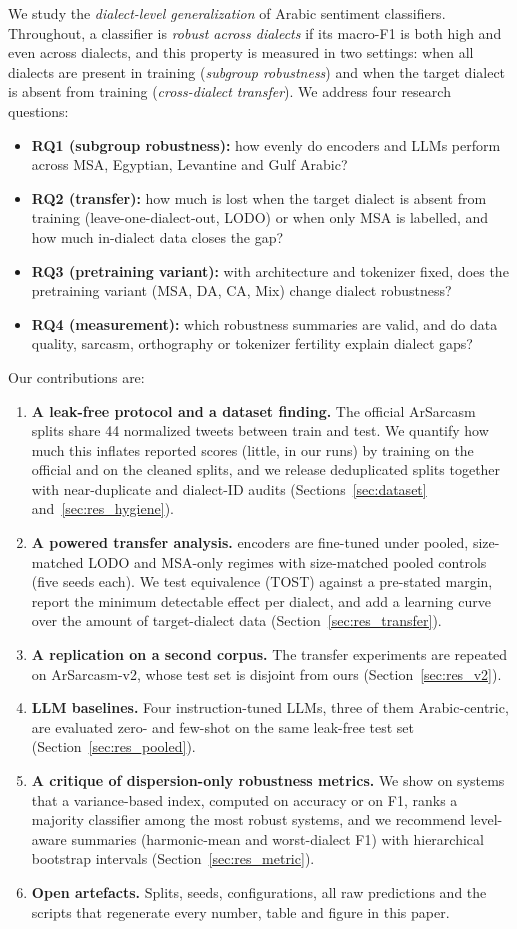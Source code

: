 \documentclass[11pt]{article}
\begin{document}
We study the \emph{dialect-level generalization} of Arabic sentiment classifiers. Throughout, a classifier is \emph{robust across dialects} if its macro-F1 is both high and even across dialects, and this property is measured in two settings: when all dialects are present in training (\emph{subgroup robustness}) and when the target dialect is absent from training (\emph{cross-dialect transfer}). We address four research questions:
\begin{itemize}
\item \textbf{RQ1 (subgroup robustness):} how evenly do encoders and LLMs perform across MSA, Egyptian, Levantine and Gulf Arabic?
\item \textbf{RQ2 (transfer):} how much is lost when the target dialect is absent from training (leave-one-dialect-out, LODO) or when only MSA is labelled, and how much in-dialect data closes the gap?
\item \textbf{RQ3 (pretraining variant):} with architecture and tokenizer fixed, does the pretraining variant (MSA, DA, CA, Mix) change dialect robustness?
\item \textbf{RQ4 (measurement):} which robustness summaries are valid, and do data quality, sarcasm, orthography or tokenizer fertility explain dialect gaps?
\end{itemize}
Our contributions are:
\begin{enumerate}
\item \textbf{A leak-free protocol and a dataset finding.} The official ArSarcasm splits share 44 normalized tweets between train and test. We quantify how much this inflates reported scores (little, in our runs) by training on the official and on the cleaned splits, and we release deduplicated splits together with near-duplicate and dialect-ID audits (Sections~\ref{sec:dataset} and~\ref{sec:res_hygiene}).
\item \textbf{A powered transfer analysis.} \nEnc{} encoders are fine-tuned under pooled, size-matched LODO and MSA-only regimes with size-matched pooled controls (five seeds each). We test equivalence (TOST) against a pre-stated margin, report the minimum detectable effect per dialect, and add a learning curve over the amount of target-dialect data (Section~\ref{sec:res_transfer}).
\item \textbf{A replication on a second corpus.} The transfer experiments are repeated on ArSarcasm-v2, whose test set is disjoint from ours (Section~\ref{sec:res_v2}).
\item \textbf{LLM baselines.} Four instruction-tuned LLMs, three of them Arabic-centric, are evaluated zero- and few-shot on the same leak-free test set (Section~\ref{sec:res_pooled}).
\item \textbf{A critique of dispersion-only robustness metrics.} We show on \mvN{} systems that a variance-based index, computed on accuracy or on F1, ranks a majority classifier among the most robust systems, and we recommend level-aware summaries (harmonic-mean and worst-dialect F1) with hierarchical bootstrap intervals (Section~\ref{sec:res_metric}).
\item \textbf{Open artefacts.} Splits, seeds, configurations, all raw predictions and the scripts that regenerate every number, table and figure in this paper.
\end{enumerate}
\end{document}
